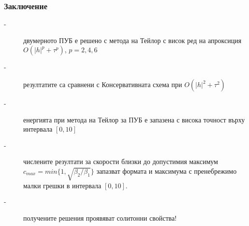 \documentclass{beamer}
\begin{document}

\begin{frame}
\frametitle{Заключение}

\begin{description}
 \item[-] двумерното ПУБ е решено с метода на Тейлор с висок ред на апроксиция $O(|h|^p+\tau^p)$, $p=2,4,6$
 \item[-] резултатите са сравнени с Консервативната схема при $O(|h|^2+\tau^2)$
 \item[-] енергията при метода на Тейлор за ПУБ е запазена с висока точност върху интервала $[0, 10]$
 \item[-] числените резултати за скорости близки до допустимия максимум $c_{max} = min\{1, \sqrt{\beta_2/\beta_1} \}$ запазват формата и максимума с пренебрежимо малки грешки в интервала $[0, 10]$.
\item[-] получените решения проявяват солитонни свойства!
\end{description}

\end{frame}

\end{document}
